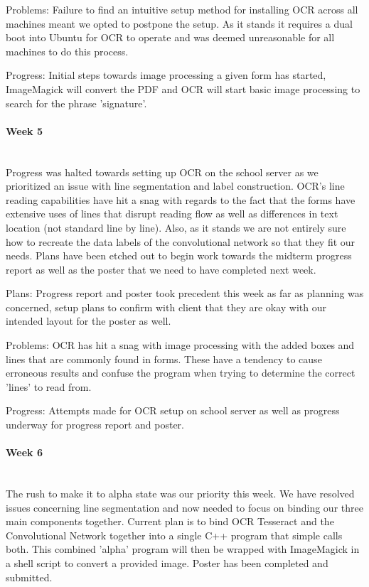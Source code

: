 \documentclass[article, onecolumn, draftclsnofoot,10pt, compsoc]{IEEEtran}
\begin{document}
Problems:
Failure to find an intuitive setup method for installing OCR across all machines meant we opted to postpone the setup. As it stands it requires a dual boot into Ubuntu for OCR to operate and was deemed unreasonable for all machines to do this process. 
 
Progress:
Initial steps towards image processing a given form has started, ImageMagick will convert the PDF and OCR will start basic image processing to search for the phrase 'signature'.

\paragraph{Week 5}
\mbox{}\\
Progress was halted towards setting up OCR on the school server as we prioritized an issue with line segmentation and label construction. OCR's line reading capabilities have hit a snag with regards to the fact that the forms have extensive uses of lines that disrupt reading flow as well as differences in text location (not standard line by line). Also, as it stands we are not entirely sure how to recreate the data labels of the convolutional network so that they fit our needs. Plans have been etched out to begin work towards the midterm progress report as well as the poster that we need to have completed next week.
 
Plans:
Progress report and poster took precedent this week as far as planning was concerned, setup plans to confirm with client that they are okay with our intended layout for the poster as well.
 
Problems:
OCR has hit a snag with image processing with the added boxes and lines that are commonly found in forms. These have a tendency to cause erroneous results and confuse the program when trying to determine the correct 'lines' to read from.
 
Progress:
Attempts made for OCR setup on school server as well as progress underway for progress report and poster.

\paragraph{Week 6}
\mbox{}\\
The rush to make it to alpha state was our priority this week. We have resolved issues concerning line segmentation and now needed to focus on binding our three main components together. Current plan is to bind OCR Tesseract and the Convolutional Network together into a single C++ program that simple calls both. This combined 'alpha' program will then be wrapped with ImageMagick in a shell script to convert a provided image. Poster has been completed and submitted.
 
\end{document}
